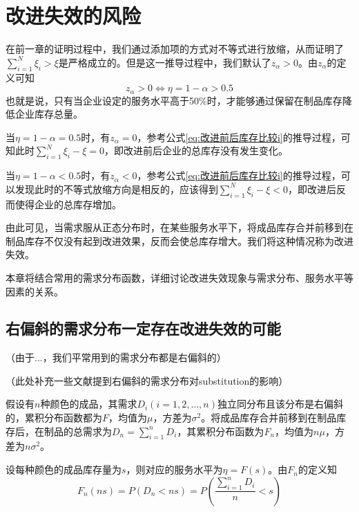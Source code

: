 
\chapter{改进失效的风险}

在前一章的证明过程中，我们通过添加项的方式对不等式进行放缩，从而证明了$\sum_{i=1}^N\xi_i > \xi$是严格成立的。但是这一推导过程中，我们默认了$z_\alpha>0$。由$z_\alpha$的定义可知
\[
z_\alpha>0 \Longleftrightarrow \eta=1-\alpha > 0.5
\]
也就是说，只有当企业设定的服务水平高于50\%时，才能够通过保留在制品库存降低企业库存总量。

当$\eta=1-\alpha=0.5$时，有$z_\alpha=0$，参考公式\ref{eq:改进前后库存比较i}的推导过程，可知此时$\sum_{i=1}^N\xi_i - \xi = 0$，即改进前后企业的总库存没有发生变化。

当$\eta=1-\alpha<0.5$时，有$z_\alpha<0$，参考公式\ref{eq:改进前后库存比较i}的推导过程，可以发现此时的不等式放缩方向是相反的，应该得到$\sum_{i=1}^N\xi_i - \xi < 0$，即改进后反而使得企业的总库存增加。

由此可见，当需求服从正态分布时，在某些服务水平下，将成品库存合并前移到在制品库存不仅没有起到改进效果，反而会使总库存增大。我们将这种情况称为改进失效。

本章将结合常用的需求分布函数，详细讨论改进失效现象与需求分布、服务水平等因素的关系。







\section{右偏斜的需求分布一定存在改进失效的可能}

（由于...，我们平常用到的需求分布都是右偏斜的）

（此处补充一些文献提到右偏斜的需求分布对substitution的影响）

假设有$n$种颜色的成品，其需求$D_i(i=1,2,\ldots,n)$独立同分布且该分布是右偏斜的，累积分布函数都为$F$，均值为$\mu$，方差为$\sigma^2$。将成品库存合并前移到在制品库存后，在制品的总需求为$D_n=\sum_{i=1}^nD_i$，其累积分布函数为$F_n$，均值为$n\mu$，方差为$n\sigma^2$。

设每种颜色的成品库存量为$s$，则对应的服务水平为$\eta=F(s)$。由$F_n$的定义知
\begin{equation}
F_n(ns) = P(D_n<ns) = P\left(\frac{\sum_{i=1}^nD_i}{n}<s\right)
\label{eq:Fn转为均值形式}
\end{equation}

